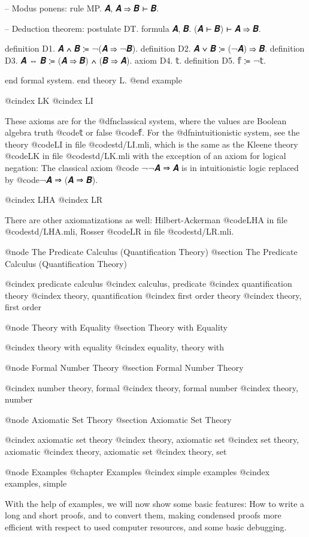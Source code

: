   -- Modus ponens:
  rule MP. 𝑨, 𝑨 ⇒ 𝑩 ⊢ 𝑩.

  -- Deduction theorem:
  postulate DT. formula 𝑨, 𝑩. (𝑨 ⊢ 𝑩) ⊢ 𝑨 ⇒ 𝑩.

  definition D1. 𝑨 ∧ 𝑩 ≔ ¬(𝑨 ⇒ ¬𝑩).  
  definition D2. 𝑨 ∨ 𝑩 ≔ (¬𝑨) ⇒ 𝑩.
  definition D3. 𝑨 ⇔ 𝑩 ≔ (𝑨 ⇒ 𝑩) ∧ (𝑩 ⇒ 𝑨).
  axiom D4. 𝕥.
  definition D5. 𝕗 ≔ ¬𝕥.

  end formal system.
end theory L.
@end example

@cindex LK
@cindex LI

These axioms are for the @dfn{classical system}, where the values are Boolean algebra truth @code{𝕥} or false @code{𝕗}. For the @dfn{intuitionistic system}, see the theory @code{LI} in file @code{std/LI.mli}, which is the same as the Kleene theory @code{LK} in file @code{std/LK.mli} with the exception of an axiom for logical negation: The classical axiom @code{
¬¬𝑨 ⇒ 𝑨} is in intuitionistic logic replaced by @code{¬𝑨 ⇒ (𝑨 ⇒ 𝑩)}.

@cindex LHA
@cindex LR

There are other axiomatizations as well: Hilbert-Ackerman @code{LHA} in file @code{std/LHA.mli}, Rosser @code{LR} in file @code{std/LR.mli}.


@node The Predicate Calculus (Quantification Theory)
@section The Predicate Calculus (Quantification Theory)

@cindex predicate calculus
@cindex calculus, predicate
@cindex quantification theory
@cindex theory, quantification
@cindex first order theory
@cindex theory, first order


@node Theory with Equality
@section Theory with Equality

@cindex theory with equality
@cindex equality, theory with



@node Formal Number Theory
@section Formal Number Theory

@cindex number theory, formal
@cindex theory, formal number
@cindex theory, number



@node Axiomatic Set Theory
@section Axiomatic Set Theory

@cindex axiomatic set theory
@cindex theory, axiomatic set
@cindex set theory, axiomatic
@cindex theory, axiomatic set
@cindex theory, set



@node Examples
@chapter Examples
@cindex simple examples
@cindex examples, simple

With the help of examples, we will now show some basic features: How to write a long and short proofs, and to convert them, making condensed proofs more efficient with respect to used computer resources, and some basic debugging.


